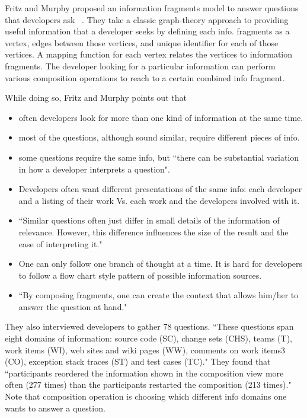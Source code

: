 Fritz and Murphy proposed an information fragments model to answer questions that developers ask ~\cite{Fritz:2010}. They take a classic graph-theory approach to providing useful information that a developer seeks by defining each info. fragments as a vertex, edges between those vertices, and unique identifier for each of those vertices. A mapping function for each vertex relates the vertices to information fragments. The developer looking for a particular information can perform various composition operations to reach to a certain combined info fragment. 

While doing so, Fritz and Murphy points out that 
\begin{itemize}
\item often developers look for more than one kind of information at the same time.
\item most of the questions, although sound similar, require different pieces of info.
\item some questions require the same info, but ``there can be substantial variation in how a developer interprets a question".
\item Developers often want different presentations of the same info: each developer and a listing of their work Vs. each work and the developers involved with it.
\item ``Similar questions often just differ in small details of the information of relevance. However, this difference influences the size of the result and the ease of interpreting it."
\item One can only follow one branch of thought at a time. It is hard for developers to follow a flow chart style pattern of possible information sources.
\item ``By composing fragments, one can create the context that allows him/her to answer the question at hand."

\end{itemize}

They also interviewed developers to gather 78 questions. ``These questions span eight domains of information: source code (SC), change sets (CHS), teams (T), work items (WI), web sites and wiki pages (WW), comments on work items3 (CO), exception stack traces (ST) and test cases (TC)."  They found that ``participants reordered the information shown in the composition view more often (277 times) than the participants restarted the composition (213 times)." Note that composition operation is choosing which different info domains one wants to answer a question.

